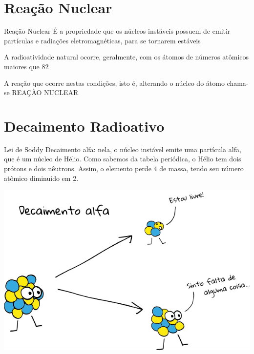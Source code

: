 \documentclass[presentation,professionalfonts,aspectratio=169]{beamer}
\begin{document}
\section{Reação Nuclear}
\label{sec:orgc45ca54}

\begin{frame}[label={sec:org409de9b}]{Reação Nuclear}
É a propriedade que os núcleos instáveis possuem de emitir partículas e radiações eletromagnéticas, para se tornarem estáveis


A radioatividade natural ocorre, geralmente, com os átomos de números atômicos maiores que 82


A reação que ocorre nestas condições, isto é, alterando o núcleo do átomo chama-se \alert{REAÇÃO NUCLEAR}
\end{frame}


\section{Decaimento Radioativo}
\label{sec:org7d0ac52}


\begin{frame}[label={sec:org2e29425}]{Lei de Soddy}
\alert{Decaimento alfa:} nela, o núcleo instável emite uma partícula alfa, que é um núcleo de Hélio. Como sabemos da tabela periódica, o Hélio tem dois prótons e dois nêutrons. Assim, o elemento perde 4 de massa, tendo seu número atômico diminuído em 2.

\begin{center}
\end{center}

\begin{center}
\includegraphics[scale=0.2]{FQ/Radioatividade/alfa.png}
\end{center}
\end{frame}
\end{document}
